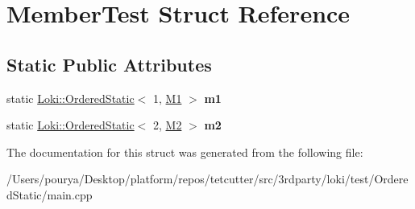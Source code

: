 \hypertarget{structMemberTest}{}\section{Member\+Test Struct Reference}
\label{structMemberTest}
\subsection*{Static Public Attributes}
\begin{DoxyCompactItemize}
\item 
\hypertarget{structMemberTest_a7acf2e0b8e3be04cb50d60501d03b17d}{}static \hyperlink{classLoki_1_1OrderedStatic}{Loki\+::\+Ordered\+Static}$<$ 1, \hyperlink{structM1}{M1} $>$ {\bfseries m1}\label{structMemberTest_a7acf2e0b8e3be04cb50d60501d03b17d}

\item 
\hypertarget{structMemberTest_aa4cc61bdff0b9bb7d0225cb845f49ea8}{}static \hyperlink{classLoki_1_1OrderedStatic}{Loki\+::\+Ordered\+Static}$<$ 2, \hyperlink{structM2}{M2} $>$ {\bfseries m2}\label{structMemberTest_aa4cc61bdff0b9bb7d0225cb845f49ea8}

\end{DoxyCompactItemize}


The documentation for this struct was generated from the following file\+:\begin{DoxyCompactItemize}
\item 
/\+Users/pourya/\+Desktop/platform/repos/tetcutter/src/3rdparty/loki/test/\+Ordered\+Static/main.\+cpp\end{DoxyCompactItemize}
